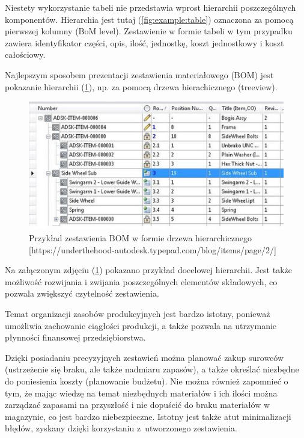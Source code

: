 \documentclass[12pt,twoside]{article}
\begin{document}
Niestety wykorzystanie tabeli nie przedstawia wprost hierarchii poszczególnych komponentów. Hierarchia jest tutaj (\ref{fig:example:table}) oznaczona za pomocą pierwszej kolumny (BoM level). Zestawienie w formie tabeli w tym przypadku zawiera identyfikator części, opis, ilość, jednostkę, koszt jednostkowy i koszt całościowy.

Najlepszym sposobem prezentacji zestawienia materiałowego (BOM) jest pokazanie hierarchii (\ref{fig:example:hierarchy}), np. za pomocą drzewa hierachicznego (treeview).

\begin{figure}[h]
	\centering
	\includegraphics[width=\textwidth]{figures/examples/hierarchy.jpg}
	\caption{Przykład zestawienia BOM w formie drzewa hierarchicznego [https://underthehood-autodesk.typepad.com/blog/items/page/2/]}
\label{fig:example:hierarchy}
\end{figure}

Na załączonym zdjęciu (\ref{fig:example:hierarchy}) pokazano przykład docelowej hierarchii. Jest także możliwość rozwijania i zwijania poszczególnych elementów składowych, co pozwala zwiększyć czytelność zestawienia.

Temat organizacji zasobów produkcyjnych jest bardzo istotny, ponieważ umożliwia zachowanie ciągłości produkcji, a także pozwala na utrzymanie płynności finansowej przedsiębiorstwa.

Dzięki posiadaniu precyzyjnych zestawień można planować zakup surowców (ustrzeżenie się braku, ale także nadmiaru zapasów), a także określać niezbędne do poniesienia koszty (planowanie budżetu). Nie można również zapomnieć o tym, że mając wiedzę na temat niezbędnych materiałów i ich ilości można zarządzać zapasami na przyszłość i nie dopuścić do braku materiałów w magazynie, co jest bardzo niebezpieczne. Istotny jest także atut minimalizacji błędów, zyskany dzięki korzystaniu z~utworzonego zestawienia.
\end{document}
